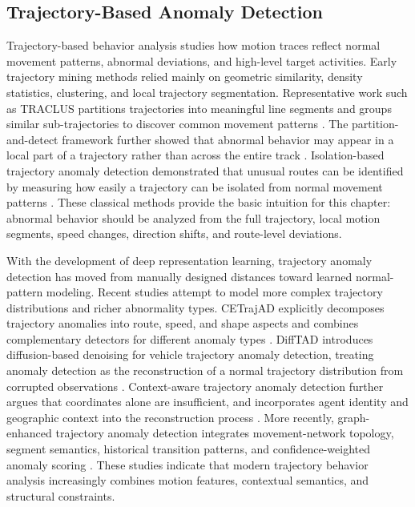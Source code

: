 \subsection{Trajectory-Based Anomaly Detection}
Trajectory-based behavior analysis studies how motion traces reflect normal movement patterns, abnormal deviations, and high-level target activities. Early trajectory mining methods relied mainly on geometric similarity, density statistics, clustering, and local trajectory segmentation. Representative work such as TRACLUS partitions trajectories into meaningful line segments and groups similar sub-trajectories to discover common movement patterns \cite{lee2007traclus}. The partition-and-detect framework further showed that abnormal behavior may appear in a local part of a trajectory rather than across the entire track \cite{lee2008traod}. Isolation-based trajectory anomaly detection demonstrated that unusual routes can be identified by measuring how easily a trajectory can be isolated from normal movement patterns \cite{zhang2011ibat}. These classical methods provide the basic intuition for this chapter: abnormal behavior should be analyzed from the full trajectory, local motion segments, speed changes, direction shifts, and route-level deviations.

With the development of deep representation learning, trajectory anomaly detection has moved from manually designed distances toward learned normal-pattern modeling. Recent studies attempt to model more complex trajectory distributions and richer abnormality types. CETrajAD explicitly decomposes trajectory anomalies into route, speed, and shape aspects and combines complementary detectors for different anomaly types \cite{cao2025cetrajectory}. DiffTAD introduces diffusion-based denoising for vehicle trajectory anomaly detection, treating anomaly detection as the reconstruction of a normal trajectory distribution from corrupted observations \cite{li2024difftad}. Context-aware trajectory anomaly detection further argues that coordinates alone are insufficient, and incorporates agent identity and geographic context into the reconstruction process \cite{hu2024contexttrajad}. More recently, graph-enhanced trajectory anomaly detection integrates movement-network topology, segment semantics, historical transition patterns, and confidence-weighted anomaly scoring \cite{mbuya2025getad}. These studies indicate that modern trajectory behavior analysis increasingly combines motion features, contextual semantics, and structural constraints.

